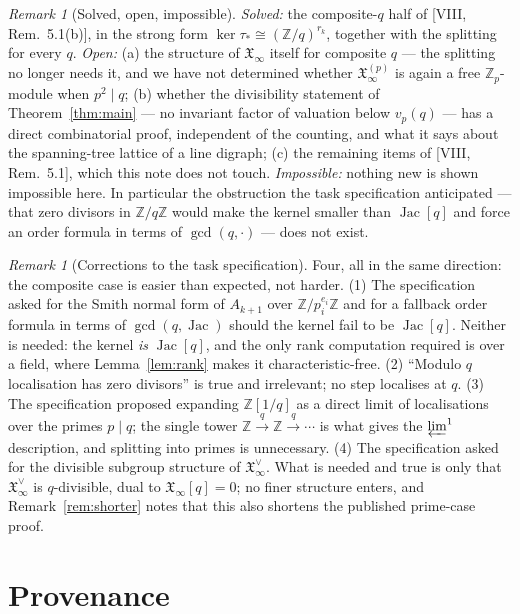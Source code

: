 \documentclass[11pt]{amsart}
\numberwithin{equation}{section}
\theoremstyle{definition}
\theoremstyle{remark}
\newtheorem{remark}[theorem]{Remark}
\newcommand{\Z}{\mathbb{Z}}
\newcommand{\XX}{\mathfrak{X}_\infty}
\newcommand{\Jac}{\operatorname{Jac}}
\newcommand{\ta}{\tau_*}
\begin{document}
\begin{remark}[Solved, open, impossible]\label{rem:soi}
\emph{Solved:} the composite-$q$ half of [VIII, Rem.~5.1(b)], in the strong form
$\ker\ta\cong(\Z/q)^{r_k}$, together with the splitting for every $q$.
\emph{Open:} (a) the structure of $\XX$ itself for composite $q$ --- the splitting no
longer needs it, and we have not determined whether $\XX^{(p)}$ is again a free
$\Z_p$-module when $p^2\mid q$; (b) whether the divisibility statement of
Theorem~\ref{thm:main} --- no invariant factor of valuation below $v_p(q)$ --- has a
direct combinatorial proof, independent of the counting, and what it says about the
spanning-tree lattice of a line digraph; (c) the remaining items of [VIII, Rem.~5.1],
which this note does not touch.
\emph{Impossible:} nothing new is shown impossible here. In particular the obstruction the
task specification anticipated --- that zero divisors in $\Z/q\Z$ would make the kernel
smaller than $\Jac[q]$ and force an order formula in terms of $\gcd(q,\cdot)$ --- does not
exist.
\end{remark}

\begin{remark}[Corrections to the task specification]\label{rem:corrections}
Four, all in the same direction: the composite case is easier than expected, not harder.
(1) The specification asked for the Smith normal form of $A_{k+1}$ over
$\Z/p_i^{e_i}\Z$ and for a fallback order formula in terms of $\gcd(q,\Jac)$ should the
kernel fail to be $\Jac[q]$. Neither is needed: the kernel \emph{is} $\Jac[q]$, and the
only rank computation required is over a field, where Lemma~\ref{lem:rank} makes it
characteristic-free. (2) ``Modulo $q$ localisation has zero divisors'' is true and
irrelevant; no step localises at $q$. (3) The specification proposed expanding $\Z[1/q]$
as a direct limit of localisations over the primes $p\mid q$; the single tower
$\Z\xrightarrow{q}\Z\xrightarrow{q}\cdots$ is what gives the $\varprojlim^1$ description,
and splitting into primes is unnecessary. (4) The specification asked for the divisible
subgroup structure of $\XX^\vee$. What is needed and true is only that $\XX^\vee$ is
$q$-divisible, dual to $\XX[q]=0$; no finer structure enters, and
Remark~\ref{rem:shorter} notes that this also shortens the published prime-case proof.
\end{remark}

\section*{Provenance}
\end{document}

